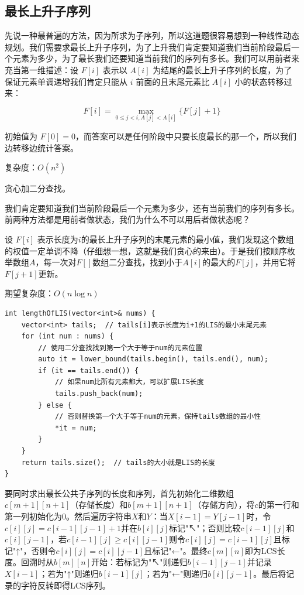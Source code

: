 \documentclass[./../main.tex]{subfiles}
\begin{document}
\subsection{最长上升子序列}
先说一种最普遍的方法，因为所求为子序列，所以这道题很容易想到一种线性动态规划。我们需要求最长上升子序列，为了上升我们肯定要知道我们当前阶段最后一个元素为多少，为了最长我们还要知道当前我们的序列有多长。我们可以用前者来充当第一维描述：设 $F[i]$ 表示以 $A[i]$ 为结尾的最长上升子序列的长度，为了保证元素单调递增我们肯定只能从 $i$ 前面的且末尾元素比 $A[i]$ 小的状态转移过来：

$$
F[i] =
\max_{0 \leq j < i, A[j] < A[i]} \{F[j] + 1\}
$$

初始值为 $F[0] = 0$，而答案可以是任何阶段中只要长度最长的那一个，所以我们边转移边统计答案。

复杂度：$O(n^{2})$

贪心加二分查找。

我们肯定要知道我们当前阶段最后一个元素为多少，还有当前我们的序列有多长。前两种方法都是用前者做状态，我们为什么不可以用后者做状态呢？

设 $F[i]$ 表示长度为$i$的最长上升子序列的末尾元素的最小值，我们发现这个数组的权值一定单调不降（仔细想一想，这就是我们贪心的来由）。于是我们按顺序枚举数组$A$，每一次对$F[]$数组二分查找，找到小于$A[i]$的最大的$F[j]$，并用它将$F[j+1]$更新。

期望复杂度：$O(n\log n)$

\begin{lstlisting}
int lengthOfLIS(vector<int>& nums) {
    vector<int> tails;  // tails[i]表示长度为i+1的LIS的最小末尾元素
    for (int num : nums) {
        // 使用二分查找找到第一个大于等于num的元素位置
        auto it = lower_bound(tails.begin(), tails.end(), num);
        if (it == tails.end()) {
            // 如果num比所有元素都大，可以扩展LIS长度
            tails.push_back(num);
        } else {
            // 否则替换第一个大于等于num的元素，保持tails数组的最小性
            *it = num;
        }
    }
    return tails.size();  // tails的大小就是LIS的长度
}
\end{lstlisting}

要同时求出最长公共子序列的长度和序列，首先初始化二维数组$c[m+1][n+1]$（存储长度）和$b[m+1][n+1]$（存储方向），将$c$的第一行和第一列初始化为0。然后遍历字符串$X$和$Y$：当$X[i-1]=Y[j-1]$时，令$c[i][j]=c[i-1][j-1]+1$并在$b[i][j]$标记"↖"；否则比较$c[i-1][j]$和$c[i][j-1]$，若$c[i-1][j]≥c[i][j-1]$则令$c[i][j]=c[i-1][j]$且标记"↑"，否则令$c[i][j]=c[i][j-1]$且标记"←"。最终$c[m][n]$即为LCS长度。回溯时从$b[m][n]$开始：若标记为"↖"则递归$b[i-1][j-1]$并记录$X[i-1]$；若为"↑"则递归$b[i-1][j]$；若为"←"则递归$b[i][j-1]$。最后将记录的字符反转即得LCS序列。
\end{document}
